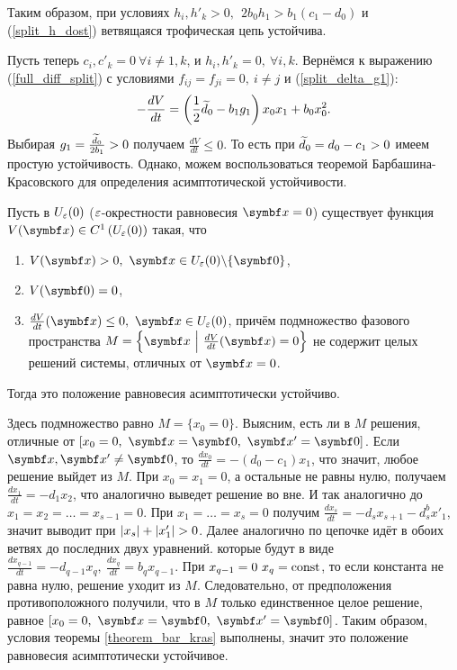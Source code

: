 Таким образом, при условиях \(h_i, h'_k > 0, ~~ 2 b_0 h_1 > b_1 (c_1 - d_0)\) и (\ref{split_h_dost}) ветвящаяся трофическая цепь устойчива.

Пусть теперь \(c_i, c'_k = 0 ~ \forall i \neq 1, k \), и \(h_i, h'_k = 0, ~ \forall i, k \). Вернёмся к выражению (\ref{full_diff_split}) с условиями \(f_{ij} = f_{ji} = 0, ~ i \neq j\) и (\ref{split_delta_g1}):
\begin{equation}
    - \frac{dV}{dt} = \left( \frac{1}{2} \widetilde{d}_0 - b_1 g_1 \right) x_0 x_1 + b_0 x_0^2.
\end{equation}
Выбирая \(g_1 = \frac{\widetilde{d}_0}{2 b_1} > 0\) получаем \(\frac{dV}{dt} \leq 0\). То есть при \(\widetilde{d}_0 = d_0 - c_1 > 0\) имеем простую устойчивость. Однако, можем воспользоваться теоремой Барбашина-Красовского\cite{barabashin_stability} для определения асимптотической устойчивости.

\begin{theorem} \label{theorem_bar_kras}
    Пусть в \(U_\varepsilon(0)\) (\(\varepsilon\)-окрестности равновесия \(\mb{x} = 0\)) существует функция \(V(\mb{x}) \in C^1\left( U_\veps(0) \right)\) такая, что
    \begin{enumerate}
        \item \(V(\mb{x}) > 0, ~ \mb{x} \in U_\veps(0) \backslash \{\mb{0}\}\),
        \item \(V(\mb{0}) = 0\),
        \item \(\frac{dV}{dt}(\mb{x}) \leq 0, ~ \mb{x} \in U_\veps(0) \), причём подмножество фазового пространства \( M = \left\{ \mb{x} ~ \Big\vert ~ \frac{dV}{dt}(\mb{x}) = 0 \right\} \) не содержит целых решений системы, отличных от \(\mb{x} = 0\).
    \end{enumerate}
    Тогда это положение равновесия асимптотически устойчиво.
\end{theorem}

Здесь подмножество равно \( M = \{ x_0 = 0 \} \). Выясним, есть ли в \(M\) решения, отличные от \( [x_0 = 0, ~ \mb{x} = \mb{0}, ~ \mb{x'} = \mb{0}] \). Если \( \mb{x}, \mb{x'} \neq \mb{0} \), то \(\frac{dx_0}{dt} = -(d_0 - c_1) x_1\), что значит, любое решение выйдет из \(M\). При \(x_0 = x_1 = 0\), а остальные не равны нулю, получаем \(\frac{dx_1}{dt} = -d_1 x_2\), что аналогично выведет решение во вне. И так аналогично до \( x_1 = x_2 = \dots = x_{s-1} = 0 \). При \(x_1 = \dots = x_{s} = 0\) получим \( \frac{d x_s}{dt} = -d_{s} x_{s+1} - d^b_s x'_1 \), значит выводит при \( \left\vert x_s \right\vert + \left\vert x'_1 \right\vert > 0\). Далее аналогично по цепочке идёт в обоих ветвях до последних двух уравнений. которые будут в виде \(\frac{dx_{q-1}}{dt} = -d_{q-1} x_q, ~ \frac{d x_q}{dt} = b_q x_{q-1}\). При \(x_{q-1} = 0 ~ x_q = \operatorname{const} \), то если константа не равна нулю, решение уходит из \(M\). Следовательно, от предположения противоположного получили, что в \(M\) только единственное целое решение, равное \( [x_0 = 0, ~ \mb{x} = \mb{0}, ~ \mb{x'} = \mb{0}] \). Таким образом, условия теоремы \eqref{theorem_bar_kras} выполнены, значит это положение равновесия асимптотически устойчивое.

